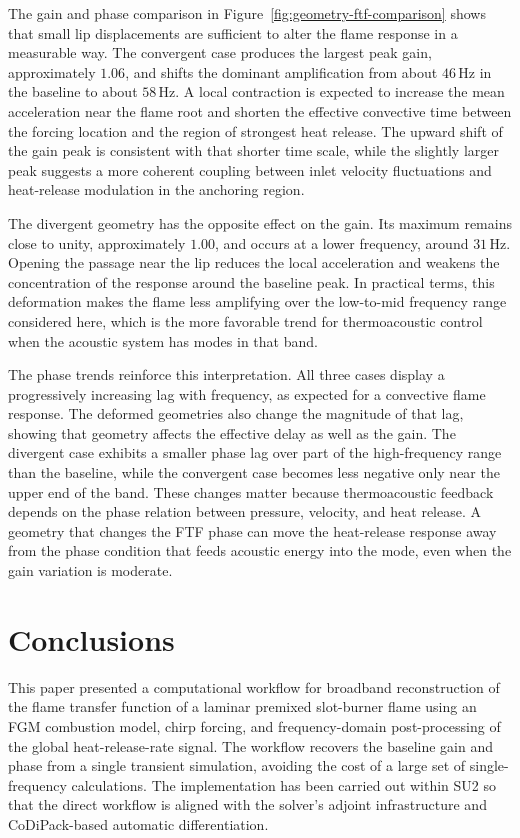 \documentclass{iopconfser}
\begin{document}
The gain and phase comparison in Figure~\ref{fig:geometry-ftf-comparison} shows that small lip displacements are sufficient to alter the flame response in a measurable way. The convergent case produces the largest peak gain, approximately $1.06$, and shifts the dominant amplification from about $46\,\mathrm{Hz}$ in the baseline to about $58\,\mathrm{Hz}$. A local contraction is expected to increase the mean acceleration near the flame root and shorten the effective convective time between the forcing location and the region of strongest heat release. The upward shift of the gain peak is consistent with that shorter time scale, while the slightly larger peak suggests a more coherent coupling between inlet velocity fluctuations and heat-release modulation in the anchoring region.

The divergent geometry has the opposite effect on the gain. Its maximum remains close to unity, approximately $1.00$, and occurs at a lower frequency, around $31\,\mathrm{Hz}$. Opening the passage near the lip reduces the local acceleration and weakens the concentration of the response around the baseline peak. In practical terms, this deformation makes the flame less amplifying over the low-to-mid frequency range considered here, which is the more favorable trend for thermoacoustic control when the acoustic system has modes in that band.

The phase trends reinforce this interpretation. All three cases display a progressively increasing lag with frequency, as expected for a convective flame response. The deformed geometries also change the magnitude of that lag, showing that geometry affects the effective delay as well as the gain. The divergent case exhibits a smaller phase lag over part of the high-frequency range than the baseline, while the convergent case becomes less negative only near the upper end of the band. These changes matter because thermoacoustic feedback depends on the phase relation between pressure, velocity, and heat release. A geometry that changes the FTF phase can move the heat-release response away from the phase condition that feeds acoustic energy into the mode, even when the gain variation is moderate.

\section{Conclusions}
\label{sec:conclusions}

This paper presented a computational workflow for broadband reconstruction of the flame transfer function of a laminar premixed slot-burner flame using an FGM combustion model, chirp forcing, and frequency-domain post-processing of the global heat-release-rate signal. The workflow recovers the baseline gain and phase from a single transient simulation, avoiding the cost of a large set of single-frequency calculations. The implementation has been carried out within SU2 so that the direct workflow is aligned with the solver's adjoint infrastructure and CoDiPack-based automatic differentiation.
\end{document}
